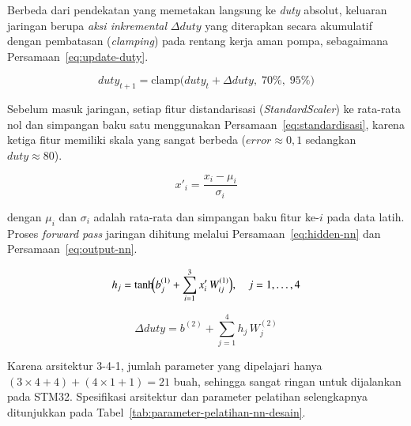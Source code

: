 Berbeda dari pendekatan yang memetakan langsung ke \emph{duty} absolut,
keluaran jaringan berupa \emph{aksi inkremental} $\Delta duty$ yang
diterapkan secara akumulatif dengan pembatasan (\emph{clamping}) pada
rentang kerja aman pompa, sebagaimana Persamaan~\ref{eq:update-duty}.

\begin{equation}
  duty_{t+1} = \mathrm{clamp}\bigl(duty_t + \Delta duty,\; 70\%,\; 95\%\bigr)
  \label{eq:update-duty}
\end{equation}

Sebelum masuk jaringan, setiap fitur distandarisasi
(\emph{StandardScaler}) ke rata-rata nol dan simpangan baku satu
menggunakan Persamaan~\ref{eq:standardisasi}, karena ketiga fitur
memiliki skala yang sangat berbeda ($error \approx 0{,}1$ sedangkan
$duty \approx 80$).

\begin{equation}
  x'_i = \frac{x_i - \mu_i}{\sigma_i}
  \label{eq:standardisasi}
\end{equation}

dengan $\mu_i$ dan $\sigma_i$ adalah rata-rata dan simpangan baku fitur
ke-$i$ pada data latih. Proses \emph{forward pass} jaringan dihitung
melalui Persamaan~\ref{eq:hidden-nn} dan Persamaan~\ref{eq:output-nn}.

\begin{equation}
  h_j = \tanh\!\Bigl( b^{(1)}_j + \sum_{i=1}^{3} x'_i\, W^{(1)}_{ij} \Bigr),
  \quad j = 1,\dots,4
  \label{eq:hidden-nn}
\end{equation}

\begin{equation}
  \Delta duty = b^{(2)} + \sum_{j=1}^{4} h_j\, W^{(2)}_{j}
  \label{eq:output-nn}
\end{equation}

Karena arsitektur 3-4-1, jumlah parameter yang dipelajari hanya
$(3\times4 + 4) + (4\times1 + 1) = 21$ buah, sehingga sangat ringan
untuk dijalankan pada STM32. Spesifikasi arsitektur dan parameter
pelatihan selengkapnya ditunjukkan pada
Tabel~\ref{tab:parameter-pelatihan-nn-desain}.


